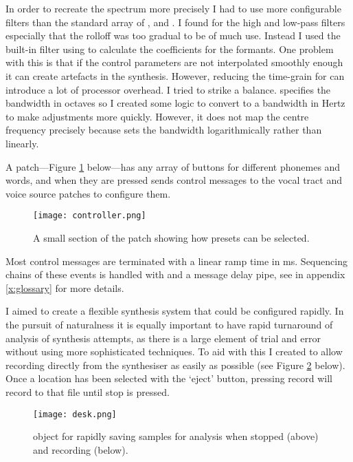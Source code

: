 In order to recreate the spectrum more precisely I had to use more configurable filters than the standard array of ,  and . I found for the high and low-pass filters especially that the rolloff was too gradual to be of much use. Instead I used the built-in  filter using  to calculate the coefficients for the formants. One problem with this is that if the control parameters are not interpolated smoothly enough it can create artefacts in the synthesis. However, reducing the time-grain for  can introduce a lot of processor overhead. I tried to strike a balance.  specifies the bandwidth in octaves so I created some logic to convert to a bandwidth in Hertz to make adjustments more quickly. However, it does not map the centre frequency precisely because  sets the bandwidth logarithmically rather than linearly. 

A  patch—Figure \ref{fig:controller} below—has any array of buttons for different phonemes and words, and when they are pressed sends control messages to the vocal tract and voice source patches to configure them.
%
\begin{figure}[H] 
	\centering
	\texttt{[image: controller.png]}
	\caption{A small section of the  patch showing how presets can be selected.}
	\label{fig:controller}
\end{figure}
%
Most control messages are terminated with a linear ramp time in ms. Sequencing chains of these events is handled with  and a message delay pipe, see  in appendix \ref{x:glossary} for more details.

I aimed to create a flexible synthesis system that could be configured rapidly. In the pursuit of naturalness it is equally important to have rapid turnaround of analysis of synthesis attempts, as there is a large element of trial and error without using more sophisticated techniques. To aid with this I created  to allow recording directly from the synthesiser as easily as possible (see Figure \ref{fig:desk} below). Once a location has been selected with the `eject' button, pressing record will record to that file until stop is pressed.
%
\begin{figure}[H]
	\centering
	\texttt{[image: desk.png]}
	\caption{ object for rapidly saving samples for analysis when stopped (above) and recording (below).}
	\label{fig:desk}
\end{figure}
%